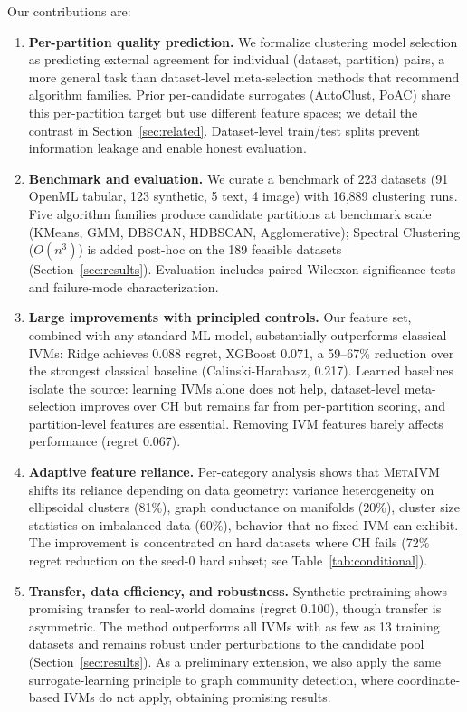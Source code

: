 \documentclass[10pt]{article} %
\newcommand{\ours}{\textsc{MetaIVM}}
\begin{document}
Our contributions are:
\begin{enumerate}
    \item \textbf{Per-partition quality prediction.} We formalize clustering model selection as predicting external agreement for individual (dataset, partition) pairs, a more general task than dataset-level meta-selection methods that recommend algorithm families. Prior per-candidate surrogates (AutoClust, PoAC) share this per-partition target but use different feature spaces; we detail the contrast in Section~\ref{sec:related}. Dataset-level train/test splits prevent information leakage and enable honest evaluation.
    \item \textbf{Benchmark and evaluation.} We curate a benchmark of 223 datasets (91 OpenML tabular, 123 synthetic, 5 text, 4 image) with 16,889 clustering runs. Five algorithm families produce candidate partitions at benchmark scale (KMeans, GMM, DBSCAN, HDBSCAN, Agglomerative); Spectral Clustering ($O(n^3)$) is added post-hoc on the 189 feasible datasets (Section~\ref{sec:results}). Evaluation includes paired Wilcoxon significance tests and failure-mode characterization.
    \item \textbf{Large improvements with principled controls.} Our feature set, combined with any standard ML model, substantially outperforms classical IVMs: Ridge achieves 0.088 regret, XGBoost 0.071, a 59--67\% reduction over the strongest classical baseline (Calinski-Harabasz, 0.217). Learned baselines isolate the source: learning IVMs alone does not help, dataset-level meta-selection improves over CH but remains far from per-partition scoring, and partition-level features are essential. Removing IVM features barely affects performance (regret 0.067).
    \item \textbf{Adaptive feature reliance.} Per-category analysis shows that \ours{} shifts its reliance depending on data geometry: variance heterogeneity on ellipsoidal clusters (81\%), graph conductance on manifolds (20\%), cluster size statistics on imbalanced data (60\%), behavior that no fixed IVM can exhibit. The improvement is concentrated on hard datasets where CH fails (72\% regret reduction on the seed-0 hard subset; see Table~\ref{tab:conditional}).
    \item \textbf{Transfer, data efficiency, and robustness.} Synthetic pretraining shows promising transfer to real-world domains (regret 0.100), though transfer is asymmetric. The method outperforms all IVMs with as few as 13 training datasets and remains robust under perturbations to the candidate pool (Section~\ref{sec:results}). As a preliminary extension, we also apply the same surrogate-learning principle to graph community detection, where coordinate-based IVMs do not apply, obtaining promising results.
\end{enumerate}
\end{document}
